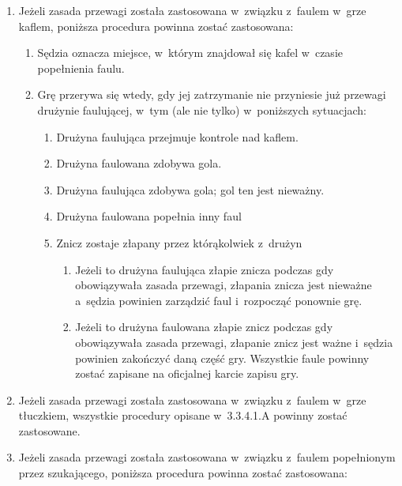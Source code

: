 \documentclass[12pt,a4paper]{article}
\begin{document}
\begin{enumerate}
	\item
	      Jeżeli zasada przewagi została zastosowana w~związku z~faulem w~grze
	      kaflem, poniższa procedura powinna zostać zastosowana:

	      \begin{enumerate}
		      \item
		            Sędzia oznacza miejsce, w~którym znajdował się kafel w~czasie
		            popełnienia faulu.
		      \item
		            Grę przerywa się wtedy, gdy jej zatrzymanie nie przyniesie już
		            przewagi drużynie faulującej, w~tym (ale nie tylko) w~poniższych
		            sytuacjach:

		            \begin{enumerate}
			            \item
			                  Drużyna faulująca przejmuje kontrole nad kaflem.
			            \item
			                  Drużyna faulowana zdobywa gola.
			            \item
			                  Drużyna faulująca zdobywa gola; gol ten jest nieważny.
			            \item
			                  Drużyna faulowana popełnia inny faul
			            \item
			                  Znicz zostaje złapany przez którąkolwiek z~drużyn

			                  \begin{enumerate}
				                  \item
				                        Jeżeli to drużyna faulująca złapie znicza podczas gdy
				                        obowiązywała zasada przewagi, złapania znicza jest nieważne a~sędzia powinien zarządzić faul i~rozpocząć ponownie grę.
				                  \item
				                        Jeżeli to drużyna faulowana złapie znicz podczas gdy
				                        obowiązywała zasada przewagi, złapanie znicz jest ważne i~sędzia
				                        powinien zakończyć daną część gry. Wszystkie faule powinny
				                        zostać zapisane na oficjalnej karcie zapisu gry.
			                  \end{enumerate}
		            \end{enumerate}
	      \end{enumerate}
	\item
	      Jeżeli zasada przewagi została zastosowana w~związku z~faulem w~grze
	      tłuczkiem, wszystkie procedury opisane w~3.3.4.1.A powinny zostać
	      zastosowane.
	\item
	      Jeżeli zasada przewagi została zastosowana w~związku z~faulem
	      popełnionym przez szukającego, poniższa procedura powinna zostać
	      zastosowana:


\end{enumerate}
\end{document}
